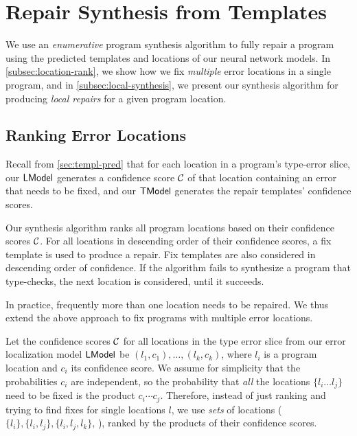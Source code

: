 \section{Repair Synthesis from Templates}
\label{sec:synthesis}
We use an \emph{enumerative} program synthesis algorithm to fully repair a
program using the predicted templates and locations of our neural network
models. In \autoref{subsec:location-rank}, we show how we fix \emph{multiple}
error locations in a single program, and in \autoref{subsec:local-synthesis}, we
present our synthesis algorithm for producing \emph{local repairs} for a given
program location.

\subsection{Ranking Error Locations}
\label{subsec:location-rank}

Recall from \autoref{sec:templ-pred} that for each location in a program's
type-error slice, our $\mathsf{LModel}$ generates a confidence score $\mathcal{C}$ of that
location containing an error that needs to be fixed, and our $\mathsf{TModel}$ generates
the repair templates' confidence scores.

Our synthesis algorithm ranks all program locations based on their confidence
scores $\mathcal{C}$. For all locations in descending order of their confidence
scores, a fix template is used to produce a repair. Fix templates are also
considered in descending order of confidence. If the algorithm fails to
synthesize a program that type-checks, the next location is considered, until it
succeeds.

In practice, frequently more than one location needs to be repaired. We thus
extend the above approach to fix programs with multiple error locations.

Let the confidence scores $\mathcal{C}$ for all locations in the type error slice from
our error localization model $\mathsf{LModel}$ be $(l_1, c_1), \dots, (l_k, c_k)$, where
$l_i$ is a program location and $c_i$ its confidence score. We assume for
simplicity that the probabilities $c_i$ are independent, so
the probability that \emph{all} the locations $\{l_i \dots l_j\}$ need to be fixed
is the product $c_i \cdots c_j$. Therefore, instead of
just ranking and trying to find fixes for single locations $l$,
we use \emph{sets} of locations ($\{l_i\}, \{l_i, l_j\}, \{l_i, l_j, l_k\}$, \etc),
ranked by the products of their confidence scores.


